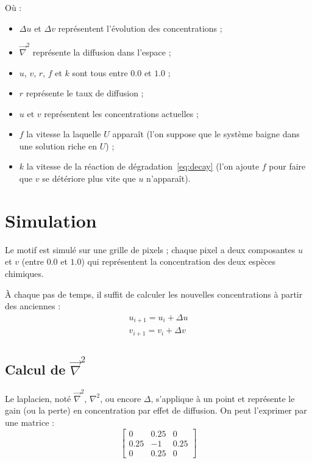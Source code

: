 \documentclass[11pt]{scrartcl}
\begin{document}
        Où :
        \begin{itemize}
            \setlength\itemsep{.05em}
            \item $\Delta u$ et $\Delta v$ représentent l'évolution des concentrations ;
            \item $\overrightarrow{\nabla}^2$ représente la diffusion dans l'espace ;
            \item $u$, $v$, $r$, $f$ et $k$ sont tous entre $0.0$ et $1.0$ ;
            \item $r$ représente le taux de diffusion ;
            \item $u$ et $v$ représentent les concentrations actuelles ;
            \item $f$ la vitesse la laquelle $U$ apparaît (l'on suppose que le système baigne dans une solution
                  riche en $U$) ;
            \item $k$ la vitesse de la réaction de
                  dégradation~\ref{eq:decay} (l'on ajoute $f$ pour faire que $v$ se
                  détériore plus vite que $u$ n'apparaît).
        \end{itemize}

    \section{Simulation}\label{sec:simulation}

        Le motif est simulé sur une grille de pixels ; chaque pixel a deux composantes $u$ et $v$ (entre $0.0$ et $1.0$)
        qui représentent la concentration des deux espèces chimiques.

        À chaque pas de temps, il suffit de calculer les nouvelles concentrations à partir des anciennes :
        \begin{gather*}
            u_{i + 1} = u_i + \Delta u \\
            v_{i + 1} = v_i + \Delta v
        \end{gather*}

        \subsection{Calcul de $\overrightarrow{\nabla}^2$}\label{subsec:laplace}

            Le laplacien, noté $\overrightarrow{\nabla}^2$, $\nabla^2$, ou encore $\Delta$, s'applique à
            un point et représente le gain (ou la perte) en concentration par effet de diffusion.
            On peut l'exprimer par une matrice :
            \[
                \begin{bmatrix}
                    0 & 0.25 & 0 \\
                    0.25 & -1 & 0.25 \\
                    0 & 0.25 & 0
                \end{bmatrix}
            \]
\end{document}
